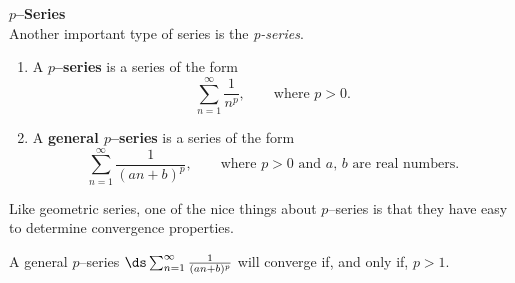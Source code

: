 \noindent\textbf{\large $p$--Series}\\

Another important type of series is the \emph{p-series}.

{\begin{enumerate}
\item	A \textbf{$p$--series} is a series of the form $$\sum_{n=1}^\infty \frac{1}{n^p}, \qquad \text{where $p>0$.}$$

\item	A \textbf{general $p$--series} is a series of the form 
$$\sum_{n=1}^\infty \frac{1}{(an+b)^p}, \qquad \text{where $p>0$ and $a$, $b$ are real numbers.}$$
\end{enumerate}
}

Like geometric series, one of the nice things about $p$--series is that they have easy to determine convergence properties.

{A general $p$--series $\ds\sum_{n=1}^\infty \frac{1}{(an+b)^p}$ will converge if, and only if, $p>1$.
}

